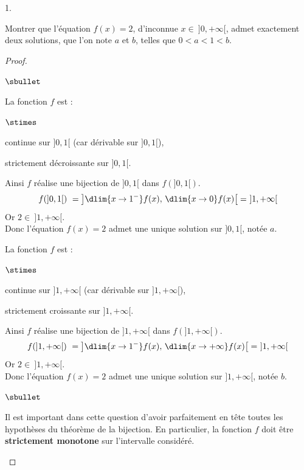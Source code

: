 \begin{noliste}{1.}
  \item Montrer que l'équation $f(x)=2$, d'inconnue $x \in \ 
  ]0,+\infty[$, admet exactement deux solutions, que l'on note $a$ et 
  $b$, telles que $0<a<1<b$.
  
  \begin{proof}~
    \begin{noliste}{$\sbullet$}
      \item La fonction $f$ est : 
      \begin{noliste}{$\stimes$}
	\item continue sur $]0,1[$ (car dérivable sur $]0,1[$),
	\item strictement décroissante sur $]0,1[$.
      \end{noliste}
      Ainsi $f$ réalise une bijection de $]0,1[$ dans $f(]0,1[)$.
      \[
        f(]0,1[) \ = \left] \dlim{x\to 1^-} f(x), \, \dlim{x\to 0}
        f(x) \right[ = \ ]1, + \infty[
      \]
      Or $2 \in \ ]1, +\infty[$.\\
      Donc l'équation $f(x)=2$ admet une unique solution sur $]0,1[$, 
      notée $a$.
      
      
      \newpage
      
      
      \item La fonction $f$ est : 
      \begin{noliste}{$\stimes$}
	\item continue sur $]1,+\infty[$ (car dérivable sur 
	$]1,+\infty[$),
	\item strictement croissante sur $]1,+\infty[$.
      \end{noliste}
      Ainsi $f$ réalise une bijection de $]1,+\infty[$ dans 
      $f(]1,+\infty[)$.
      \[
        f(]1,+\infty[) \ = \left] \dlim{x\to 1^-} f(x), \, \dlim{x\to 
	+\infty} f(x) \right[ = \ ]1, + \infty[
      \]
      Or $2 \in \ ]1, +\infty[$.\\
      Donc l'équation $f(x)=2$ admet une unique solution sur 
      $]1,+\infty[$, notée $b$.
    \end{noliste}
    \conc{Finalement, l'équation $f(x)=2$ admet exactement $2$ 
    solutions sur $]0,+\infty[$ notées $a$ et $b$\\[.1cm]
    telles que 
    $0<a<1<b$.}
    
    \begin{remark}
      \begin{noliste}{$\sbullet$}
	\item Il est important dans cette question d'avoir parfaitement
	en tête toutes les hypothèses du théorème de la bijection. En 
	particulier, la fonction $f$ doit être {\bf strictement 
	monotone} sur l'intervalle considéré.
	

\end{noliste}
\end{remark}
\end{proof}
\end{noliste}
